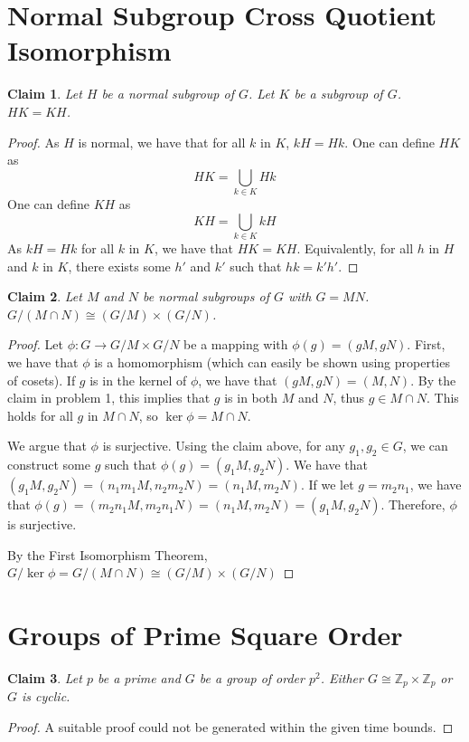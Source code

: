 \documentclass[12pt]{article}
\newtheorem*{claim*}{Claim}
\newcommand*{\Z}{\mathbb{Z}}
\begin{document}
\section{Normal Subgroup Cross Quotient Isomorphism}
\begin{claim*}
Let $H$ be a normal subgroup of $G$. Let $K$ be a subgroup of $G$. $HK = KH$.
\end{claim*}
\begin{proof}
As $H$ is normal, we have that for all $k$ in $K$, $kH = Hk$. One can define $HK$ as 
\[ HK = \bigcup_{k \in K} Hk \]
One can define $KH$ as 
\[ KH = \bigcup_{k \in K} kH \]
As $kH = Hk$ for all $k$ in $K$, we have that $HK = KH$. Equivalently, for all $h$ in $H$ and $k$ in $K$, there exists some $h'$ and $k'$ such that $hk = k' h'$.
\end{proof}
\begin{claim*}
Let $M$ and $N$ be normal subgroups of $G$ with $G = MN$. $G / (M \cap N) \cong (G/M) \times (G/N)$. 
\end{claim*}
\begin{proof}
Let $\phi : G \rightarrow G/M \times G/N$ be a mapping with $\phi(g) = (gM, gN)$. First, we have that $\phi$ is a homomorphism (which can easily be shown using properties of cosets). If $g$ is in the kernel of $\phi$, we have that $(gM,gN) = (M, N)$. By the claim in problem 1, this implies that $g$ is in both $M$ and $N$, thus $g \in M \cap N$. This holds for all $g$ in $M \cap N$, so $\ker \phi = M \cap N$.

We argue that $\phi$ is surjective. Using the claim above, for any $g_1, g_2 \in G$, we can construct some $g$ such that $\phi(g) = (g_1M, g_2N)$. We have that $(g_1M, g_2N) = (n_1m_1M, n_2m_2N) = (n_1M, m_2N)$. If we let $g = m_2 n_1$, we have that $\phi(g) = (m_2 n_1 M, m_2 n_1 N) = (n_1M, m_2N) = (g_1M, g_2N)$. Therefore, $\phi$ is surjective.

By the First Isomorphism Theorem, $G / \ker \phi = G / (M \cap N) \cong (G/M) \times (G/N)$
\end{proof}

\section{Groups of Prime Square Order}
\begin{claim*}
Let $p$ be a prime and $G$ be a group of order $p^2$. Either $G \cong \Z_p \times \Z_p$ or $G$ is cyclic.
\end{claim*}
\begin{proof}
A suitable proof could not be generated within the given time bounds.
\end{proof}
\end{document}
